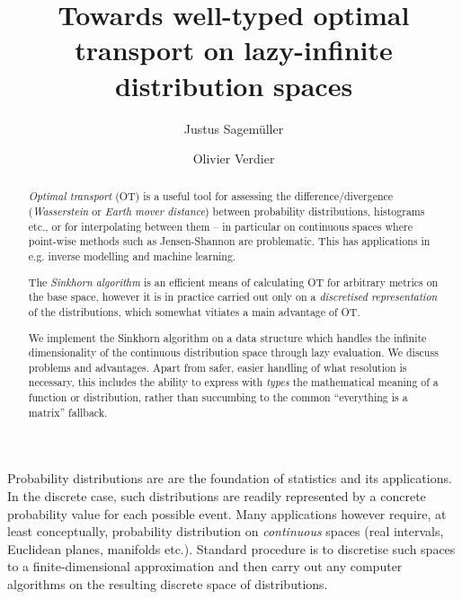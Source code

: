 \documentclass[a4paper]{easychair}
\title{Towards well-typed optimal transport on lazy-infinite distribution spaces}
\author{
   Justus Sagemüller\inst{1}
\and
    Olivier Verdier\inst{1}
}
\institute{
  Western Norway University of Applied Sciences, 
  Bergen, Norway\\
  \email{\{jsag,over\}@hvl.no}
 }
\begin{document}
\maketitle

\begin{abstract}
  \emph{Optimal transport} (OT) is a useful tool for assessing the difference/divergence (\emph{Wasserstein} or \emph{Earth mover distance}) between probability distributions, histograms etc., or for interpolating between them -- in particular on continuous spaces where point-wise methods such as Jensen-Shannon are problematic. This has applications in e.g. inverse modelling and machine learning.
  
  The \emph{Sinkhorn algorithm} is an efficient means of calculating OT for arbitrary metrics on the base space, however it is in practice carried out only on a \emph{discretised representation} of the distributions, which somewhat vitiates a main advantage of OT.
  
  We implement the Sinkhorn algorithm on a data structure which handles the infinite dimensionality of the continuous distribution space through lazy evaluation. We discuss problems and advantages. Apart from safer, easier handling of what resolution is necessary, this includes the ability to express with \emph{types} the mathematical meaning of a function or distribution, rather than succumbing to the common “everything is a matrix” fallback.
\end{abstract}

\label{sec:introduction}
\noindent%
Probability distributions are are the foundation of statistics and its applications. In the discrete case, such distributions are readily represented by a concrete probability value for each possible event. Many applications however require, at least conceptually, probability distribution on \emph{continuous} spaces (real intervals, Euclidean planes, manifolds etc.). Standard procedure is to discretise such spaces to a finite-dimensional approximation and then carry out any computer algorithms on the resulting discrete space of distributions.




%
%

%
%
%



\end{document}
